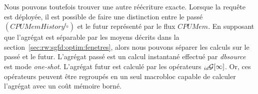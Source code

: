 Nous pouvons toutefois trouver une autre réécriture exacte. Lorsque la requête est déployée, il est possible de faire une distinction entre le passé $(CPUMemHistory^{t_0})$ et le futur représenté par le flux $CPUMem$. En supposant que l'agrégat est séparable par les moyens décrits dans la section~\ref{sec:rw:sgfd:optim:fenetres}, alors nous pouvons séparer les calculs sur le passé et le futur. L'agrégat passé est un calcul instantané effectué par \textit{dbsource} est mode \textit{one-shot}. L'agrégat futur est calculé par les opérateurs $_{id}\mathcal{G}[\infty]$. Or, ces opérateurs peuvent être regroupés en un seul macrobloc capable de calculer l'agrégat avec un coût mémoire borné.